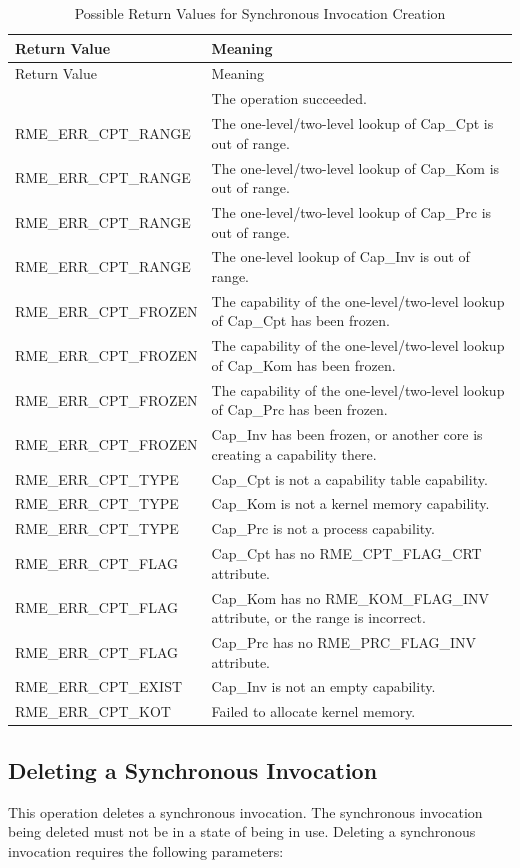 \begin{xltabular}{\textwidth}{@{}>{\hsize\raggedright\arraybackslash}X>{\hsize\raggedright\arraybackslash}X@{}}
\caption{Possible Return Values for Synchronous Invocation Creation}\label{tab:5-5-create-sync-invocation-return-values}\\
\toprule
Return Value & Meaning\tabularnewline
\endfirsthead
\toprule
Return Value & Meaning\tabularnewline
\midrule
\endhead
\bottomrule
{} & The operation succeeded.\tabularnewline
    RME\_ERR\_CPT\_RANGE & The one-level/two-level lookup of Cap\_Cpt is out of range.\tabularnewline
    RME\_ERR\_CPT\_RANGE & The one-level/two-level lookup of Cap\_Kom is out of range.\tabularnewline
    RME\_ERR\_CPT\_RANGE & The one-level/two-level lookup of Cap\_Prc is out of range.\tabularnewline
    RME\_ERR\_CPT\_RANGE & The one-level lookup of Cap\_Inv is out of range.\tabularnewline
    RME\_ERR\_CPT\_FROZEN & The capability of the one-level/two-level lookup of Cap\_Cpt has been frozen.\tabularnewline
    RME\_ERR\_CPT\_FROZEN & The capability of the one-level/two-level lookup of Cap\_Kom has been frozen.\tabularnewline
    RME\_ERR\_CPT\_FROZEN & The capability of the one-level/two-level lookup of Cap\_Prc has been frozen.\tabularnewline
    RME\_ERR\_CPT\_FROZEN & Cap\_Inv has been frozen, or another core is creating a capability there.\tabularnewline
    RME\_ERR\_CPT\_TYPE & Cap\_Cpt is not a capability table capability.\tabularnewline
    RME\_ERR\_CPT\_TYPE & Cap\_Kom is not a kernel memory capability.\tabularnewline
    RME\_ERR\_CPT\_TYPE & Cap\_Prc is not a process capability.\tabularnewline
    RME\_ERR\_CPT\_FLAG & Cap\_Cpt has no RME\_CPT\_FLAG\_CRT attribute.\tabularnewline
    RME\_ERR\_CPT\_FLAG & Cap\_Kom has no RME\_KOM\_FLAG\_INV attribute, or the range is incorrect.\tabularnewline
    RME\_ERR\_CPT\_FLAG & Cap\_Prc has no RME\_PRC\_FLAG\_INV attribute.\tabularnewline
    RME\_ERR\_CPT\_EXIST & Cap\_Inv is not an empty capability.\tabularnewline
    RME\_ERR\_CPT\_KOT & Failed to allocate kernel memory.\tabularnewline
\end{xltabular}
\nopagebreak[4]

\subsection{Deleting a Synchronous Invocation}\label{subsec:5-delete-sync-invocation}

This operation deletes a synchronous invocation. The synchronous invocation being deleted must not be in a state of being in use. Deleting a synchronous invocation requires the following parameters:

